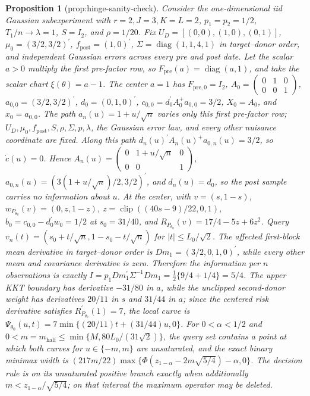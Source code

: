 \documentclass{article}
\newtheorem{proposition}{Proposition}
\begin{document}
\begin{proposition}[prop:hinge-sanity-check]\label{prop:hinge-sanity-check}
Consider the one-dimensional iid Gaussian subexperiment with \(r=2,J=3,K=L=2\), \(p_1=p_2=1/2\), \(T_1/n\to\lambda=1\), \(S=I_2\), and \(\rho=1/20\). Fix \(U_D=[(0,0),(1,0),(0,1)]\), \(\mu_0=(3/2,3/2)^{\prime}\), \(f_{\mathrm{post}}=(1,0)^{\prime}\), \(\Sigma=\operatorname{diag}(1,1,4,1)\) in target--donor order, and independent Gaussian errors across every pre and post date. Let the scalar \(a>0\) multiply the first pre-factor row, so \(F_{\mathrm{pre}}(a)=\operatorname{diag}(a,1)\), and take the scalar chart \(\xi(\theta)=a-1\). The center \(a=1\) has \(F_{\mathrm{pre},0}=I_2\), \(A_0=\begin{pmatrix}0&1&0\\0&0&1\end{pmatrix}\), \(a_{0,0}=(3/2,3/2)^{\prime}\), \(d_0=(0,1,0)^{\prime}\), \(c_{0,0}=d_0^{\prime}A_0^+a_{0,0}=3/2\), \(X_0=A_0\), and \(x_0=a_{0,0}\). The path \(a_n(u)=1+u/\sqrt n\) varies only this first pre-factor row; \(U_D,\mu_0,f_{\mathrm{post}},S,\rho,\Sigma,p,\lambda\), the Gaussian error law, and every other nuisance coordinate are fixed. Along this path \(d_n(u)^{\prime}A_n(u)^+a_{0,n}(u)=3/2\), so \(\dot c(u)=0\). Hence \(A_n(u)=\begin{pmatrix}0&1+u/\sqrt n&0\\0&0&1\end{pmatrix}\), \(a_{0,n}(u)=(3(1+u/\sqrt n)/2,3/2)^{\prime}\), and \(d_n(u)=d_0\), so the post sample carries no information about \(u\). At the center, with \(v=(s,1-s)\), \(w_{P_{\theta_0}}(v)=(0,z,1-z)\), \(z=\operatorname{clip}((40s-9)/22,0,1)\), \(b_0=c_{0,0}-d_0^{\prime}w_0=1/2\) at \(s_0=31/40\), and \(R_{P_{\theta_0}}(v)=17/4-5z+6z^2\). Query \(v_n(t)=(s_0+t/\sqrt n,1-s_0-t/\sqrt n)\) for \(|t|\le L_0/\sqrt2\). The affected first-block mean derivative in target--donor order is \(D m_1=(3/2,0,1,0)^{\prime}\), while every other mean and covariance derivative is zero. Therefore the information per \(n\) observations is exactly \(I=p_1D m_1^{\prime}\Sigma^{-1}D m_1=\tfrac12\{9/4+1/4\}=5/4\). The upper KKT boundary has derivative \(-31/80\) in \(a\), while the unclipped second-donor weight has derivatives \(20/11\) in \(s\) and \(31/44\) in \(a\); since the centered risk derivative satisfies \(R_{P_{\theta_0}}^{\prime}(1)=7\), the local curve is \(\Psi_{\theta_0}(u,t)=7\min\{(20/11)t+(31/44)u,0\}\). For \(0<\alpha<1/2\) and \(0<m=m_{\mathrm{half}}\le\min\{M,80L_0/(31\sqrt2)\}\), the query set contains a point at which both curves for \(u\in\{-m,m\}\) are unsaturated, and the exact binary minimax width is \((217m/22)\max\{\Phi(z_{1-\alpha}-2m\sqrt{5/4})-\alpha,0\}\). The decision rule is on its unsaturated positive branch exactly when additionally \(m<z_{1-\alpha}/\sqrt{5/4}\); on that interval the maximum operator may be deleted.
\end{proposition}
\end{document}
